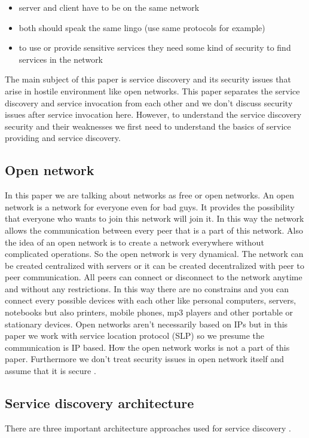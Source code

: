 \begin{itemize}
\item server and client have to be on the same network 
\item both should speak the same lingo (use same protocols for example) 
\item to use or provide sensitive services they need some kind of security to find services in the network 
\end{itemize}
The main subject of this paper is service discovery and its security issues that arise in hostile environment like open networks. This paper separates the service discovery and service invocation from each other and we don't discuss security issues after service invocation here. However, to understand the service discovery security and their weaknesses we first need to understand the basics of service providing and service discovery.\\

\subsection{Open network}
In this paper we are talking about networks as free or open networks. An open network is a network for everyone even for bad guys. It provides the possibility that everyone who wants to join this network will join it. In this way the network allows the communication between every peer that is a part of this network. Also the idea of an open network is to create a network everywhere without complicated operations. So the open network is very dynamical. The network can be created centralized with servers or it can be created decentralized with peer to peer communication. All peers can connect or disconnect to the network anytime and without any restrictions. In this way there are no constrains and you can connect every possible devices with each other like personal computers, servers, notebooks but also printers, mobile phones, mp3 players and other portable or stationary devices. Open networks aren't necessarily based on IPs but in this paper we work with service location protocol (SLP) so we presume the communication is IP based. How the open network works is not a part of this paper. Furthermore we don't treat security issues in open network itself and assume that it is secure \citep{Foundation2009}.

\subsection{Service discovery architecture}
There are three important architecture approaches used for service
discovery \citep{Ververidis2008}.

